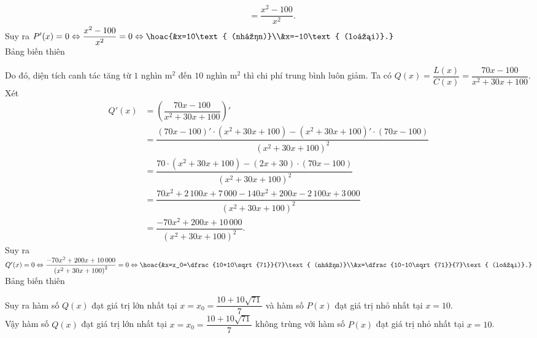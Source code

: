 \begin{ex}
{\begin{itemchoice}
\begin{align*}
				&=\dfrac{x^2-100}{x^2}.
			\end{align*}
			Suy ra $P'(x)=0\Leftrightarrow\dfrac{x^2-100}{x^2}=0\Leftrightarrow\hoac{&x=10\text{ (nhận)}\\&x=-10\text{ (loại)}.}$\\
			Bảng biến thiên
			\begin{center}
			\end{center}
			Do đó, diện tích canh tác tăng từ $1$ nghìn m$^2$ đến $10$ nghìn m$^2$ thì chi phí trung bình luôn giảm.
			\itemch Ta có $Q(x)=\dfrac{L(x)}{C(x)}=\dfrac{70x-100}{x^2+30x+100}$.\\
			Xét 
			\allowdisplaybreaks
			\begin{align*}
				Q'(x)&=\left(\dfrac{70x-100}{x^2+30x+100}\right)'\\
				&=\dfrac{(70x-100)'\cdot\left(x^2+30x+100\right)-\left(x^2+30x+100\right)'\cdot(70x-100)}{\left(x^2+30x+100\right)^2}\\
				&=\dfrac{70\cdot\left(x^2+30x+100\right)-(2x+30)\cdot(70x-100)}{\left(x^2+30x+100\right)^2}\\
				&=\dfrac{70x^2+2\,100x+7\,000-140x^2+200x-2\,100x+3\,000}{\left(x^2+30x+100\right)^2}\\
				&=\dfrac{-70x^2+200x+10\,000}{\left(x^2+30x+100\right)^2}.
			\end{align*}
			Suy ra $Q'(x)=0\Leftrightarrow\dfrac{-70x^2+200x+10\,000}{\left(x^2+30x+100\right)^2}=0\Leftrightarrow\hoac{&x=x_0=\dfrac{10+10\sqrt{71}}{7}\text{ (nhận)}\\&x=\dfrac{10-10\sqrt{71}}{7}\text{ (loại)}.}$\\
			Bảng biến thiên
			\begin{center}
			\end{center}
			Suy ra hàm số $Q(x)$ đạt giá trị lớn nhất tại $x=x_0=\dfrac{10+10\sqrt{71}}{7}$ và hàm số $P(x)$ đạt giá trị nhỏ nhất tại $x=10$.\\
			Vậy hàm số $Q(x)$ đạt giá trị lớn nhất tại $x=x_0=\dfrac{10+10\sqrt{71}}{7}$ không trùng với hàm số $P(x)$ đạt giá trị nhỏ nhất tại $x=10$.
		\end{itemchoice}
	}
\end{ex}

